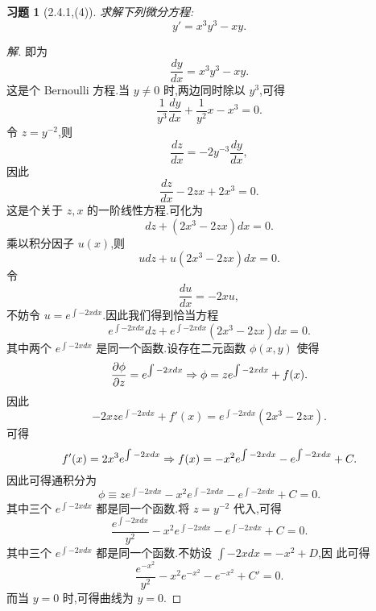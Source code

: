 \documentclass[a4paper, 12pt]{article} %
\newtheorem*{cdtheorem}{习题}
\newenvironment{exercise}
{\bigskip\begin{mdframed}[backgroundcolor=gray!40,rightline=false,leftline=false,topline=false,bottomline=false]\begin{cdtheorem}}
    {\end{cdtheorem}\end{mdframed}\bigskip}
\begin{document}
\begin{CJK}{UTF8}{gkai}
  \begin{exercise}[2.4.1,(4)]
    求解下列微分方程:
$$
y'=x^3y^3-xy.
$$
\end{exercise}
\begin{proof}[解]
即为
$$
\frac{dy}{dx}=x^3y^3-xy.
$$
这是个 Bernoulli 方程.当 $y\neq 0$ 时,两边同时除以 $y^3$,可得
$$
\frac{1}{y^3}\frac{dy}{dx}+\frac{1}{y^2}x-x^3=0.
$$
令 $z=y^{-2}$,则
$$
\frac{dz}{dx}=-2y^{-3}\frac{dy}{dx},
$$
因此
$$
\frac{dz}{dx}-2zx+2x^3=0.
$$
这是个关于 $z,x$ 的一阶线性方程.可化为
$$
dz+(2x^3-2zx)dx=0.
$$
乘以积分因子 $u(x)$,则
$$
udz+u(2x^3-2zx)dx=0.
$$
令 
$$
\frac{du}{dx}=-2xu,
$$
不妨令 $u=e^{\int -2xdx}$.因此我们得到恰当方程
$$
e^{\int -2xdx}dz+e^{\int -2xdx}(2x^3-2zx)dx=0.
$$
其中两个 $e^{\int -2xdx}$ 是同一个函数.设存在二元函数 $\phi(x,y)$ 使得
$$
\frac{\partial\phi}{\partial z}=e^{\int -2xdx}\Rightarrow \phi=ze^{\int -2xdx}+f(x).
$$
因此
$$
-2xze^{\int -2xdx}+f'(x)=e^{\int -2xdx}(2x^3-2zx).
$$
可得
$$
f'(x)=2x^3e^{\int -2xdx}\Rightarrow f(x)=-x^2e^{\int -2xdx}-e^{\int -2xdx}+C.
$$
因此可得通积分为
$$
\phi\equiv ze^{\int -2xdx}-x^2e^{\int -2xdx}-e^{\int -2xdx}+C=0.
$$
其中三个 $e^{\int -2xdx}$ 都是同一个函数.将 $z=y^{-2}$ 代入,可得
$$
\frac{e^{\int -2xdx}}{y^2}-x^2e^{\int -2xdx}-e^{\int -2xdx}+C=0.
$$
其中三个 $e^{\int -2xdx}$ 都是同一个函数.不妨设 $\int -2xdx=-x^2+D$,因
此可得
$$
\frac{e^{-x^2}}{y^2}-x^2e^{-x^2}-e^{-x^2}+C'=0.
$$
而当 $y=0$ 时,可得曲线为 $y=0$.
\end{proof}
  

  

  
\end{CJK}
\end{document}
